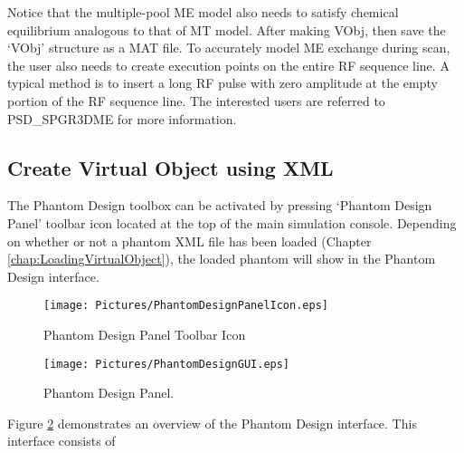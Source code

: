 \documentclass{book}%
\begin{document}
\begin{enumerate}
Notice that the multiple-pool ME model also needs to satisfy chemical equilibrium analogous to that of MT model. After making VObj, then save the `VObj' structure as a MAT file. To accurately model ME exchange during scan, the user also needs to create execution points on the entire RF sequence line. A typical method is to insert a long RF pulse with zero amplitude at the empty portion of the RF sequence line. The interested users are referred to PSD\_SPGR3DME for more information.

\end{enumerate}

\subsection{Create Virtual Object using XML}

The Phantom Design toolbox can be activated by pressing `Phantom Design Panel' toolbar icon located at the top of the main simulation console. Depending on whether or not a phantom XML file has been loaded (Chapter \ref{chap:LoadingVirtualObject}), the loaded phantom will show in the Phantom Design interface.

\begin{figure}[htbp]
	\centering
		\texttt{[image: Pictures/PhantomDesignPanelIcon.eps]}
	\caption{Phantom Design Panel Toolbar Icon}
	\label{fig:PhantomDesignPanelIcon}
\end{figure}

\begin{figure}[htbp]
	\centering
		\texttt{[image: Pictures/PhantomDesignGUI.eps]}
	\caption{Phantom Design Panel.}
	\label{fig:PhantomDesignGUI}
\end{figure}

Figure \ref{fig:PhantomDesignGUI} demonstrates an overview of the Phantom Design interface. This interface consists of 
\end{document}
